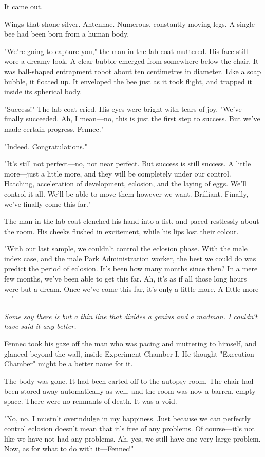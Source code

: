 It came out.

Wings that shone silver. Antennae. Numerous, constantly moving legs. A
single bee had been born from a human body.

"We're going to capture you," the man in the lab coat muttered. His face
still wore a dreamy look. A clear bubble emerged from somewhere below
the chair. It was ball-shaped entrapment robot about ten centimetres in
diameter. Like a soap bubble, it floated up. It enveloped the bee just
as it took flight, and trapped it inside its spherical body.

"Success!" The lab coat cried. His eyes were bright with tears of joy.
"We've finally succeeded. Ah, I mean---no, this is just the first step to
success. But we've made certain progress, Fennec."

"Indeed. Congratulations."

"It's still not perfect---no, not near perfect. But success is still
success. A little more---just a little more, and they will be completely
under our control. Hatching, acceleration of development, eclosion, and
the laying of eggs. We'll control it all. We'll be able to move them
however we want. Brilliant. Finally, we've finally come this far."

The man in the lab coat clenched his hand into a fist, and paced
restlessly about the room. His cheeks flushed in excitement, while his
lips lost their colour.

"With our last sample, we couldn't control the eclosion phase. With the
male index case, and the male Park Administration worker, the best we
could do was predict the period of eclosion. It's been how many months
since then? In a mere few months, we've been able to get this far. Ah,
it's as if all those long hours were but a dream. Once we've come this
far, it's only a little more. A little more---"

\emph{Some say there is but a thin line that divides a genius and a madman.
I couldn't have said it any better.}

Fennec took his gaze off the man who was pacing and muttering to
himself, and glanced beyond the wall, inside Experiment Chamber I. He
thought "Execution Chamber" might be a better name for it.

The body was gone. It had been carted off to the autopsy room. The chair
had been stored away automatically as well, and the room was now a
barren, empty space. There were no remnants of death. It was a void.

"No, no, I mustn't overindulge in my happiness. Just because we can
perfectly control eclosion doesn't mean that it's free of any problems.
Of course---it's not like we have not had any problems. Ah, yes, we still
have one very large problem. Now, as for what to do with it---Fennec!"

